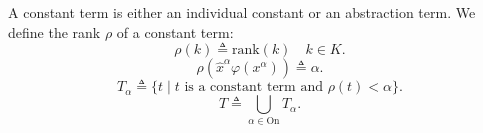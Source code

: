 A constant term is either an individual constant or an abstraction term. We define the rank $\rho$ of a constant term:
$$\rho(k) \triangleq \text{rank}(k) \quad k \in K.$$
$$\rho(\hat{x}^\alpha \varphi(x^\alpha)) \triangleq \alpha.$$
$$T_\alpha \triangleq \{t \mid t \text{ is a constant term and } \rho(t) < \alpha\}.$$
$$T \triangleq \bigcup_{\alpha \in \text{On}} T_\alpha.$$
